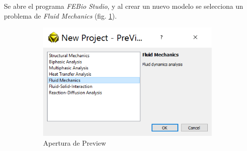 Se abre el programa \emph{FEBio Studio}, y al crear un nuevo modelo se selecciona un problema de \emph{Fluid Mechanics} (fig. \ref{fig:pre-00}).
\begin{figure}[!htp]
\centering
\begin{subfigure}[b]{0.30\textwidth}
\includegraphics[width=\linewidth]{figuras_4/00_pre_newproject.png}
\caption{Apertura de Preview}
\label{fig:pre-00}
\end{subfigure}
\begin{subfigure}[b]{0.30\textwidth}

\end{subfigure}
\end{figure}
